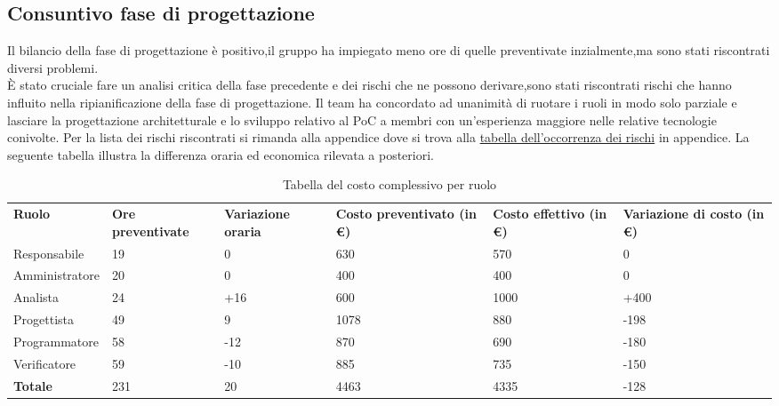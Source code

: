 \subsection{Consuntivo fase di progettazione}
Il bilancio della fase di progettazione è positivo,il gruppo ha impiegato meno ore di quelle preventivate inzialmente,ma sono stati riscontrati diversi problemi.\\
È stato cruciale fare un analisi critica della fase precedente e dei rischi che ne possono derivare,sono stati riscontrati rischi che hanno influito nella ripianificazione della fase di progettazione.
Il team ha concordato ad unanimità di ruotare i ruoli in modo solo parziale e lasciare la progettazione architetturale e lo sviluppo relativo al PoC a membri con un'esperienza
maggiore nelle relative tecnologie conivolte.
Per la lista dei rischi riscontrati si rimanda alla appendice dove si trova alla \hyperlink{Tabellaoccorrenzarischi}{tabella dell'occorrenza dei rischi} in appendice.
La seguente tabella illustra la differenza oraria ed economica rilevata a posteriori.
{
\renewcommand{\arraystretch}{2}
\begin{longtable}[h]{ C{2.5cm} C{2cm} C{1.8cm} C{2.2cm} C{1.5cm} C{2.3cm}}
\caption{Tabella del costo complessivo per ruolo}\\
\rowcolor{\primaryColor}

\textcolor{\secondaryColor}{\textbf{Ruolo}} & 
\textcolor{\secondaryColor}{\textbf{Ore preventivate}} & 
\textcolor{\secondaryColor}{\textbf{Variazione oraria}} & 
\textcolor{\secondaryColor}{\textbf{Costo preventivato (in \euro{})}} & 
\textcolor{\secondaryColor}{\textbf{Costo effettivo (in \euro{})}} & 
\textcolor{\secondaryColor}{\textbf{Variazione di costo (in \euro{})}}\\	
	
Responsabile    &  19 & 0 & 630 & 570 &  0 \\
Amministratore  &  20 & 0 & 400 & 400 & 0 \\
Analista        & 24 & +16 & 600 & 1000 & +400 \\
Progettista     &  49 & 9 & 1078 & 880 & -198 \\
Programmatore   &   58 & -12 & 870 &  690 & -180 \\
Verificatore    &  59 &  -10 & 885 & 735 & -150 \\
\textbf{Totale} & 231 & 20 & 4463 & 4335 & -128 \\	
\end{longtable}
}

